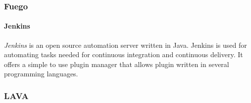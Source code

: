 \documentclass{article}
\begin{document}
		\subsubsection{Fuego}
			\paragraph{Jenkins}
				\emph{Jenkins} is an open source automation server written in Java. Jenkins is used for automating tasks needed for continuous integration and continuous delivery. It offers a simple to use plugin manager that allows plugin written in several programming languages.
		\subsubsection{LAVA}
\end{document}
